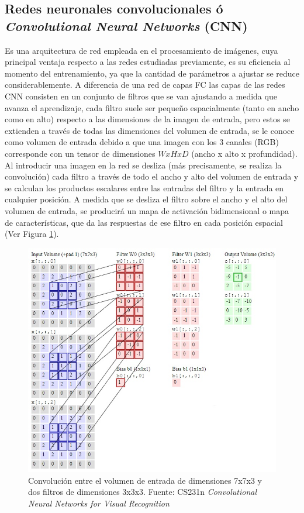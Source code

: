 \subsection{Redes neuronales convolucionales ó \textit{Convolutional Neural Networks} (CNN)}
Es una arquitectura de red empleada en el procesamiento de imágenes, cuya principal ventaja respecto a las redes estudiadas previamente, es su eficiencia al momento del entrenamiento, ya que la cantidad de parámetros a ajustar se reduce considerablemente. A diferencia de una red de capas FC las capas de las redes CNN consisten en un conjunto de filtros que se van ajustando a medida que avanza el aprendizaje, cada filtro suele ser pequeño espacialmente (tanto en ancho como en alto) respecto a las dimensiones de la imagen de entrada, pero estos se extienden a través de todas las dimensiones del volumen de entrada, se le conoce como volumen de entrada debido a que una imagen con los 3 canales (RGB) corresponde con un tensor de dimensiones $WxHxD$ (ancho x alto x profundidad). Al introducir una imagen en la red se desliza (más precisamente, se realiza la convolución) cada filtro a través de todo el ancho y alto del volumen de entrada y se calculan los productos escalares entre las entradas del filtro y la entrada en cualquier posición.  A medida que se desliza el filtro sobre el ancho y el alto del volumen de entrada, se producirá un mapa de activación bidimensional o mapa de características, que da las respuestas de ese filtro en cada posición espacial (Ver Figura \ref{fowardPassCNN}).
\begin{figure}[H]
    \centering
    \includegraphics[scale=0.7]{Recursos/fowardPassCNN.jpg}
    \caption[Convolución entre el volumen de entrada de dimensiones 7x7x3 y dos filtros de dimensiones 3x3x3.]{Convolución entre el volumen de entrada de dimensiones 7x7x3 y dos filtros de dimensiones 3x3x3. {\footnotesize Fuente: CS231n\textit{ Convolutional Neural Networks for Visual Recognition} \cite{CS231n}}}
    \label{fowardPassCNN}
\end{figure}
